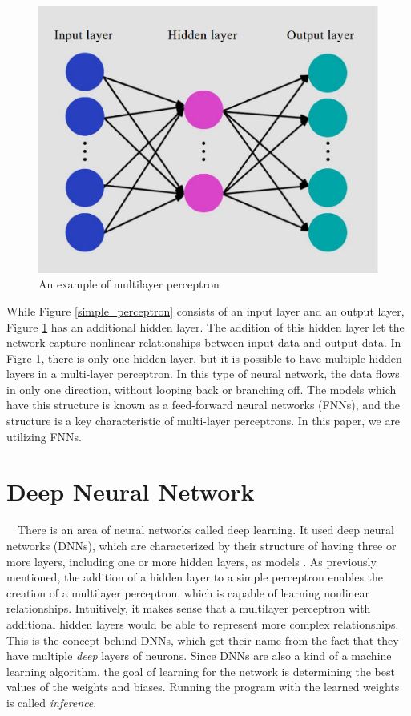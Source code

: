 \begin{figure}[h]
  \centering
  \includegraphics[width=120truemm]{resources/2_background/multi_layer_perceptron.png}
  \caption{
    An example of multilayer perceptron
  }
  \label{multilayer_perceptron}
\end{figure}
While Figure \ref{simple_perceptron} consists of an input layer and an 
output layer, Figure \ref{multilayer_perceptron} has an additional hidden 
layer. The addition of this hidden layer let the network capture nonlinear
relationships between input data and output data.
In Figre \ref{multilayer_perceptron}, there is only one hidden layer,
but it is possible to have multiple hidden layers in a multi-layer perceptron.
In this type of neural network, the data flows in only one direction, without 
looping back or branching off. The models which have this structure is known
as a feed-forward neural networks (FNNs), 
and the structure is a key characteristic of multi-layer perceptrons.
In this paper, we are utilizing FNNs.

\section{Deep Neural Network}
　There is an area of neural networks called deep learning. 
It used deep neural networks (DNNs), which are characterized by their structure
of having three or more layers, including one or more hidden layers, as models \cite{8114708}.
As previously mentioned, the addition of a hidden layer to a simple perceptron 
enables the creation of a multilayer perceptron, which is capable of learning 
nonlinear relationships. 
Intuitively, it makes sense that a multilayer perceptron with additional 
hidden layers would be able to represent more complex relationships.
This is the concept behind DNNs, which get their name from the fact that they 
have multiple \textit{deep} layers of neurons.
Since DNNs are also a kind of a machine learning algorithm, the goal of learning
for the network is determining the best values of the weights and biases. 
Running the program with the learned weights is called \textit{inference}.

